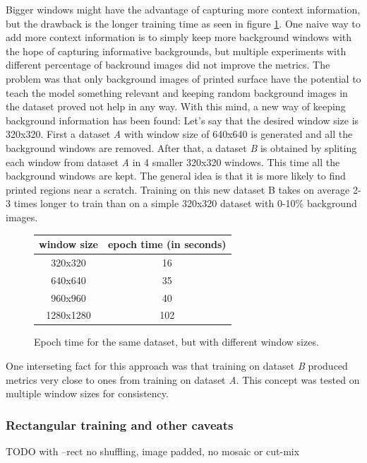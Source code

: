  Bigger windows might have the advantage of capturing more context information, but the drawback is the longer training time as seen in figure \ref{fig:win_train_times}. One naive way to add more context information is to simply keep more background windows with the hope of capturing informative backgrounds, but multiple experiments with different percentage of backround images did not improve the metrics. The problem was that only background images of printed surface have the potential to teach the model something relevant and keeping random background images in the dataset proved not help in any way. With this mind, a new way of keeping background information has been found: Let's say that the desired window size is 320x320. First a dataset \textit{A} with window size of 640x640 is generated and all the background windows are removed. After that, a dataset \textit{B} is obtained by spliting each window from dataset \textit{A} in 4 smaller 320x320 windows. This time all the background windows are kept. The general idea is that it is more likely to find printed regions near a scratch. Training on this new dataset B takes on average 2-3 times longer to train than on a simple 320x320 dataset with 0-10\% background images. \\

\begin{figure}
  \begin{tabular}{|c|c|}
  \hline
  window size & epoch time (in seconds) \\
  \hline
  320x320 & 16 \\
  \hline
  640x640 & 35 \\
  \hline
  960x960 & 40 \\
  \hline
  1280x1280 & 102 \\
  \hline
  \end{tabular}
  \caption{Epoch time for the same dataset, but with different window sizes.}
  \label{fig:win_train_times}
\end{figure}


 One interseting fact for this approach was that training on dataset \textit{B} produced metrics very close to ones from training on dataset \textit{A}. This concept was tested on multiple window sizes for consistency. \\


 \subsubsection{Rectangular training and other caveats}
 TODO
with --rect no shuffling, image padded, no mosaic or cut-mix



